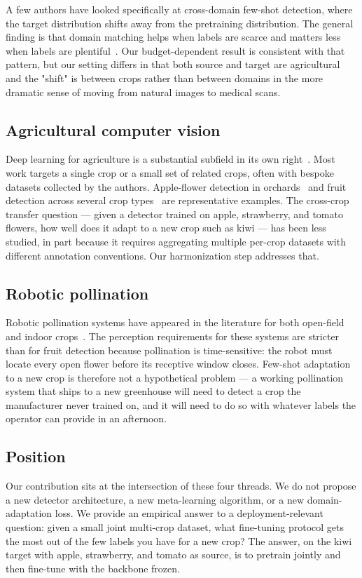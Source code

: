 A few authors have looked specifically at cross-domain few-shot detection, where the target distribution shifts away from the pretraining distribution. The general finding is that domain matching helps when labels are scarce and matters less when labels are plentiful~\cite{wang2020fsdetview, kohler2023fsdetsurvey}. Our budget-dependent result is consistent with that pattern, but our setting differs in that both source and target are agricultural and the "shift" is between crops rather than between domains in the more dramatic sense of moving from natural images to medical scans.

\subsection{Agricultural computer vision}

Deep learning for agriculture is a substantial subfield in its own right~\cite{kamilaris2018review}. Most work targets a single crop or a small set of related crops, often with bespoke datasets collected by the authors. Apple-flower detection in orchards~\cite{dias2018apple, tian2019apple} and fruit detection across several crop types~\cite{genemola2020fruit} are representative examples. The cross-crop transfer question --- given a detector trained on apple, strawberry, and tomato flowers, how well does it adapt to a new crop such as kiwi --- has been less studied, in part because it requires aggregating multiple per-crop datasets with different annotation conventions. Our harmonization step addresses that.

\subsection{Robotic pollination}

Robotic pollination systems have appeared in the literature for both open-field and indoor crops~\cite{strader2019pollination}. The perception requirements for these systems are stricter than for fruit detection because pollination is time-sensitive: the robot must locate every open flower before its receptive window closes. Few-shot adaptation to a new crop is therefore not a hypothetical problem --- a working pollination system that ships to a new greenhouse will need to detect a crop the manufacturer never trained on, and it will need to do so with whatever labels the operator can provide in an afternoon.

\subsection{Position}

Our contribution sits at the intersection of these four threads. We do not propose a new detector architecture, a new meta-learning algorithm, or a new domain-adaptation loss. We provide an empirical answer to a deployment-relevant question: given a small joint multi-crop dataset, what fine-tuning protocol gets the most out of the few labels you have for a new crop? The answer, on the kiwi target with apple, strawberry, and tomato as source, is to pretrain jointly and then fine-tune with the backbone frozen.
